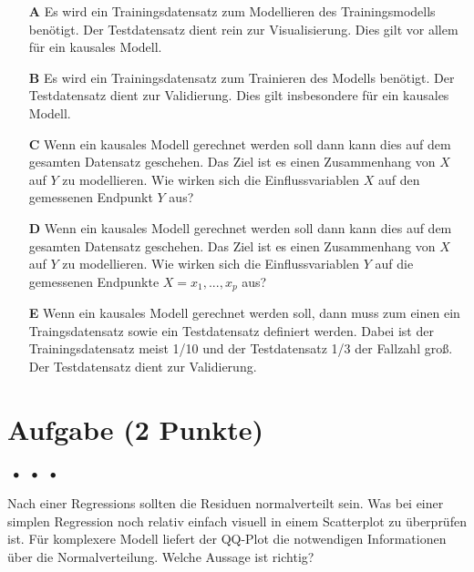 \documentclass[a4paper, 9pt]{scrartcl}\usepackage[]{graphicx}\usepackage[]{xcolor}
\begin{document}
\begin{enumerate}
\item [\textbf{A} \msquare] Es wird ein Trainingsdatensatz zum Modellieren des Trainingsmodells benötigt. Der Testdatensatz dient rein zur Visualisierung. Dies gilt vor allem für ein kausales Modell.
\item [\textbf{B} \msquare] Es wird ein Trainingsdatensatz zum Trainieren des Modells benötigt. Der Testdatensatz dient zur Validierung. Dies gilt insbesondere für ein kausales Modell.
\item [\textbf{C} \msquare] Wenn ein kausales Modell gerechnet werden soll dann kann dies auf dem gesamten Datensatz geschehen. Das Ziel ist es einen Zusammenhang von $X$ auf $Y$ zu modellieren. Wie wirken sich die Einflussvariablen $X$ auf den gemessenen Endpunkt $Y$ aus?
\item [\textbf{D} \msquare] Wenn ein kausales Modell gerechnet werden soll dann kann dies auf dem gesamten Datensatz geschehen. Das Ziel ist es einen Zusammenhang von $X$ auf $Y$ zu modellieren. Wie wirken sich die Einflussvariablen $Y$ auf die gemessenen Endpunkte $X = x_1, ..., x_p$ aus?
\item [\textbf{E} \msquare] Wenn ein kausales Modell gerechnet werden soll, dann muss zum einen ein Traingsdatensatz sowie ein Testdatensatz definiert werden. Dabei ist der Trainingsdatensatz meist 1/10 und der Testdatensatz 1/3 der Fallzahl groß. Der Testdatensatz dient zur Validierung.
\end{enumerate}

\section{Aufgabe \hfill (2 Punkte)}

\ifcollection
\begin{flushright}
\tiny\vspace{-2Ex}
\textbf{\examinhaltstart}
\exammodulestat $\;\bullet$
\exammodulestatbbv $\;\bullet$
\exammodulestatversuch $\;\bullet$
\exammodulebiostat
\vspace{-1Ex}
\end{flushright}
\fi




Nach einer Regressions sollten die Residuen normalverteilt sein. Was bei einer simplen Regression noch relativ einfach visuell in einem Scatterplot zu überprüfen ist. Für komplexere Modell liefert der QQ-Plot die notwendigen Informationen über die Normalverteilung. Welche Aussage ist richtig?
\end{document}
